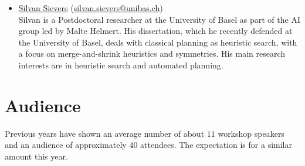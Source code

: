 \documentclass[10pt]{article}
\begin{document}
\begin{itemize}


\item \href{http://ai.cs.unibas.ch/people/}{Silvan Sievers}
  (\href{mailto:silvan.sievers@unibas.ch}{silvan.sievers@unibas.ch})\\
Silvan is a Postdoctoral researcher at the University of Basel as part of the AI group
led by Malte Helmert. His dissertation, which he recently defended at the
University of Basel, deals with classical planning as heuristic search, with a
focus on merge-and-shrink heuristics and symmetries. His main research
interests are in heuristic search and automated planning.



\end{itemize}

\section*{Audience}
Previous years have shown an average number of about $11$ workshop
speakers and an audience of approximately $40$ attendees. The
expectation is for a similar amount this year.
\end{document}
